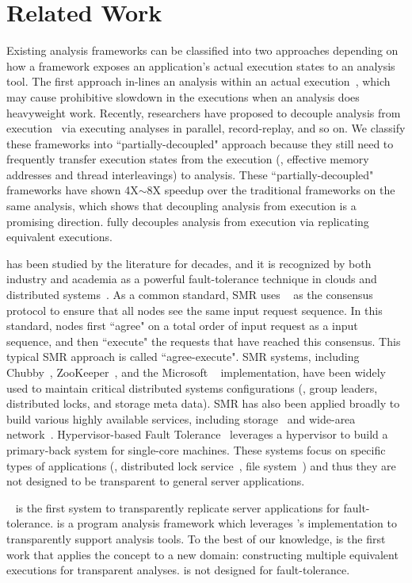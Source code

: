 \section{Related Work} \label{sec:related}

Existing analysis frameworks can be classified into two approaches depending 
on how a framework exposes an application's actual execution states to an 
analysis tool. The first approach in-lines an analysis within an 
actual execution~\cite{dynamorio, pin:pldi05, 
valgrind:pldi, lift:micro06, tsan}, which may cause prohibitive slowdown in the
executions when an analysis does heavyweight work. Recently, researchers have
proposed to 
decouple analysis from execution~\cite{decouple:usenix08, speck:asplos08, 
shadowreplica:ccs13, wester:parallelizing:asplos13, superpin, jungwoo:oopsla09} 
via executing analyses in parallel, record-replay, and so on. We classify these
frameworks into ``partially-decoupled" approach because they still need to
frequently 
transfer execution states from the execution (\eg, effective memory addresses 
and thread interleavings) to analysis. These ``partially-decoupled" frameworks 
have shown 4X$\sim$8X speedup over the traditional frameworks on the same 
analysis, which shows that decoupling analysis from execution is a promising 
direction. \xxx fully decouples analysis from execution via replicating 
equivalent executions.

\smr has been studied by the literature for decades, and it is recognized by 
both industry and academia as a powerful fault-tolerance technique in clouds 
and distributed systems~\cite{lamportclock, smr:tutorial}. As a common 
standard, SMR uses \paxos~\cite{paxos} as the consensus protocol to ensure that 
all nodes see the same input request sequence. In this standard, nodes first 
``agree" on a total order of input request as a input sequence, and then 
``execute" the requests that have reached this consensus. This typical SMR 
approach is called ``agree-execute". SMR systems, including 
Chubby~\cite{chubby:osdi}, ZooKeeper~\cite{zookeeper}, and 
the Microsoft \paxos~\cite{paxos} implementation, have been widely used to 
maintain critical distributed systems configurations (\eg, group leaders, 
distributed locks, and storage meta data). SMR has also been applied broadly to 
build various highly available services, including 
storage~\cite{paxos:datastore} and wide-area network~\cite{mencius:osdi08}. 
Hypervisor-based Fault Tolerance~\cite{hft:sosp95} leverages a hypervisor to 
build a primary-back system for single-core machines. These systems focus on 
specific types of applications (\eg, distributed lock service~\cite{chubby:osdi}, file 
system~\cite{zookeeper}) and thus they are not designed to be transparent to 
general server applications.

\repbox~\cite{repbox:sosp15} is the first \smr system to transparently 
replicate server applications for fault-tolerance. \xxx is a program analysis 
framework which leverages \repbox's \paxos implementation to transparently support analysis 
tools. To the best of our knowledge, \xxx is the first work that applies the 
\smr concept to a new domain: constructing multiple equivalent executions for transparent 
analyses. \xxx is not designed for fault-tolerance.

